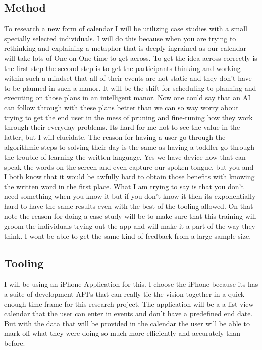 \subsection{Method}
To research a new form of calendar I will be utilizing case studies with a small specially selected individuals.
I will do this because when you are trying to rethinking and explaining a metaphor that is deeply ingrained as our calendar will take lots of One on One time to get across.
To get the idea across correctly is the first step the second step is to get the participants thinking and working within such a mindset that all of their events are not static and they don't have to be planned in such a manor.
It will be the shift for scheduling to planning and executing on those plans in an intelligent manor. Now one could say that an AI can follow through with these plans better than we can so way worry about trying to get the end user in the mess of pruning and fine-tuning how they work through their everyday problems.
Its hard for me not to see the value in the latter, but I will elucidate.
The reason for having a user go through the algorithmic steps to solving their day is the same as having a toddler go through the trouble of learning the written language.
Yes we have device now that can speak the words on the screen and even capture our spoken tongue, but you and I both know that it would be awfully hard to obtain those benefits with knowing the written word in the first place.
What I am trying to say is that you don't need something when you know it but if you don't know it then its exponentially hard to have the same results even with the best of the tooling allowed.
On that note the reason for doing a case study will be to make sure that this training will groom the individuals trying out the app and will make it a part of the way they think.
I wont be able to get the same kind of feedback from a large sample size.

\subsection{Tooling}
I will be using an iPhone Application for this. I choose the iPhone because its has a suite of development API's that can really tie the vision together in a quick enough time frame for this research project. The application will be a a list view calendar that the user can enter in events and don't have a predefined end date. But with the data that will be provided in the calendar the user will be able to mark off what they were doing so much more efficiently and accurately than before.